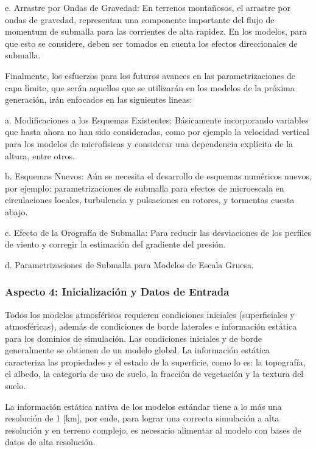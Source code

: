\begin{enumerate*}
	\item[e.] Arrastre por Ondas de Gravedad: En terrenos montañosos, el arrastre por ondas de gravedad, representan una componente importante del flujo de momentum de submalla para las corrientes de alta rapidez. En los modelos, para que esto se considere, deben ser tomados en cuenta los efectos direccionales de submalla.
\end{enumerate*}

Finalmente, los esfuerzos para los futuros avances en las parametrizaciones de capa límite, que serán aquellos que se utilizarán en los modelos de la próxima generación, irán enfocados en las siguientes lineas:
\begin{enumerate*}
	\item[a.] Modificaciones a los Esquemas Existentes: Básicamente incorporando variables que hasta ahora no han sido consideradas, como por ejemplo la velocidad vertical para los modelos de microfísicas y considerar una dependencia explícita de la altura, entre otros.
	\item[b.] Esquemas Nuevos: Aún se necesita el desarrollo de esquemas numéricos nuevos, por ejemplo: parametrizaciones de submalla para efectos de microescala en circulaciones locales, turbulencia y pulsaciones en rotores, y tormentas cuesta abajo.
	\item[c.] Efecto de la Orografía de Submalla: Para reducir las desviaciones de los perfiles de viento y corregir la estimación del gradiente del presión.
	\item[d.] Parametrizaciones de Submalla para Modelos de Escala Gruesa.
\end{enumerate*}

\subsubsection{Aspecto 4: Inicialización y Datos de Entrada}
Todos los modelos atmosféricos requieren condiciones iniciales (superficiales y atmosféricas), además de condiciones de borde laterales e información estática para los dominios de simulación. Las condiciones iniciales y de borde generalmente se obtienen de un modelo global. La información estática caracteriza las propiedades y el estado de la superficie, como lo es: la topografía, el albedo, la categoría de uso de suelo, la fracción de vegetación y la textura del suelo.

La información estática nativa de los modelos estándar tiene a lo más una resolución de 1 [km], por ende, para lograr una correcta simulación a alta resolución y en terreno complejo, es necesario alimentar al modelo con bases de datos de alta resolución.

